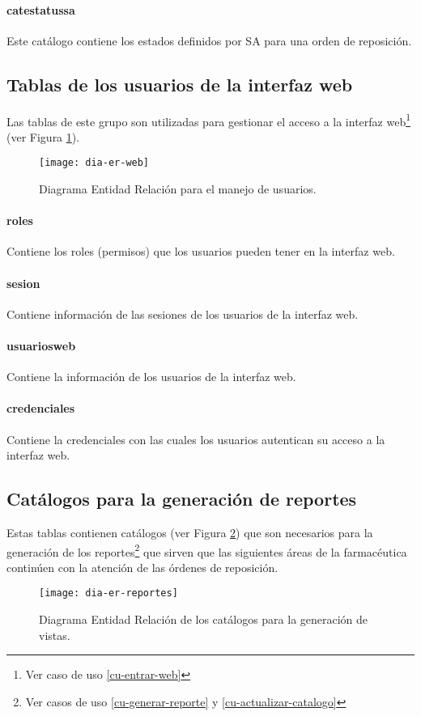 \paragraph{cat{\textunderscore}estatus{\textunderscore}sa\\} Este catálogo contiene los estados definidos por SA para una orden de reposición.


\subsection{Tablas de los usuarios de la interfaz web}
Las tablas de este grupo son utilizadas para gestionar el acceso a la interfaz web\footnote{Ver caso de uso \ref{cu-entrar-web}} (ver Figura \ref{fig:dia-er-web}).
\begin{figure}[h]
  \centering
  \texttt{[image: dia-er-web]} 
  \caption{Diagrama Entidad Relación para el manejo de usuarios.}
  \label{fig:dia-er-web}
\end{figure}
\paragraph{roles\\}Contiene los roles (permisos) que los usuarios pueden tener en la interfaz web.
\paragraph{sesion\\}Contiene información de las sesiones de los usuarios de la interfaz web.
\paragraph{usuarios{\textunderscore}web\\} Contiene la información de los usuarios de la interfaz web.
\paragraph{credenciales\\} Contiene la credenciales con las cuales los usuarios autentican su acceso a la interfaz web.


\subsection{Catálogos para la generación de reportes}
Estas tablas contienen catálogos (ver Figura \ref{fig:dia-er-reportes}) que son necesarios para la generación de los reportes\footnote{Ver casos de uso \ref{cu-generar-reporte} y \ref{cu-actualizar-catalogo}} que sirven que las siguientes áreas de la farmacéutica continúen con la atención de las órdenes de reposición.
\begin{figure}[h]
  \centering
  \texttt{[image: dia-er-reportes]} 
  \caption{Diagrama Entidad Relación de los catálogos para la generación de vistas.}
  \label{fig:dia-er-reportes}
\end{figure}
